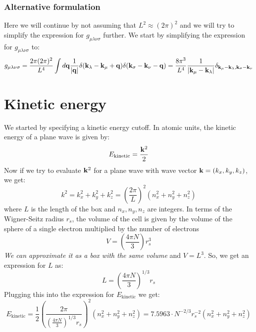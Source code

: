 \documentclass[12pt]{article}
\begin{document}
\subsubsection{Alternative formulation}
Here we will continue by not assuming that $L^2 \approx (2\pi)^2$ and we will try to simplify the expression for $g_{\mu\lambda\nu\sigma}$ further. We start by simplifying the expression for $g_{\mu\lambda\nu\sigma}$ to:
\begin{equation}
    g_{\mu\lambda\nu\sigma} = \frac{2\pi(2\pi)^2}{L^4} \int d\mathbf{q} \frac{1}{|\vb{q}|} \delta(\mathbf{k}_\lambda - \mathbf{k}_\mu + \mathbf{q}) \delta(\mathbf{k}_\sigma - \mathbf{k}_\nu - \mathbf{q}) = \frac{8\pi^3}{L^4} \frac{1}{|\mathbf{k}_\mu - \mathbf{k}_\lambda|} \delta_{\mathbf{k}_\mu - \mathbf{k}_\lambda, \mathbf{k}_\sigma - \mathbf{k}_\nu}
\end{equation}


\section{Kinetic energy}

We started by specifying a kinetic energy cutoff. In atomic units, the kinetic energy of a plane wave is given by:
\begin{equation}
    E_{\text{kinetic}} = \frac{\vb{k}^2}{2}
\end{equation}
Now if we try to evaluate $\vb{k}^2$ for a plane wave with wave vector $\vb{k} = (k_x, k_y, k_z)$, we get:
\begin{equation}
    k^2 = k_x^2 + k_y^2 + k_z^2 =  \left(\frac{2\pi}{L}\right)^2 \left(n_x^2 + n_y^2 + n_z^2\right)
\end{equation}
where $L$ is the length of the box and $n_x, n_y, n_z$ are integers. In terms of the Wigner-Seitz radius $r_s$, the volume of the cell is given by the volume of the sphere of a single electron multiplied by the number of electrons
\begin{equation}
    V = \left(\frac{4\pi N}{3}\right) r_s^3
\end{equation}
\emph{We can approximate it as a box with the same volume} and $V= L^3$. So, we get an expression for $L$ as:
\begin{equation}
    L = \left( \frac{4\pi N}{3} \right)^{1/3} r_s
\end{equation}
Plugging this into the expression for $E_{\text{kinetic}}$ we get:
\begin{equation}
    E_{\text{kinetic}} = \frac{1}{2}\left(\frac{2 \pi}{\left( \frac{4\pi N}{3} \right)^{1/3} r_s}\right)^2 \left(n_x^2 + n_y^2 + n_z^2\right) = 7.5963 \cdot N^{-2/3} r_s^{-2} \left(n_x^2 + n_y^2 + n_z^2\right)
\end{equation}
\end{document}

